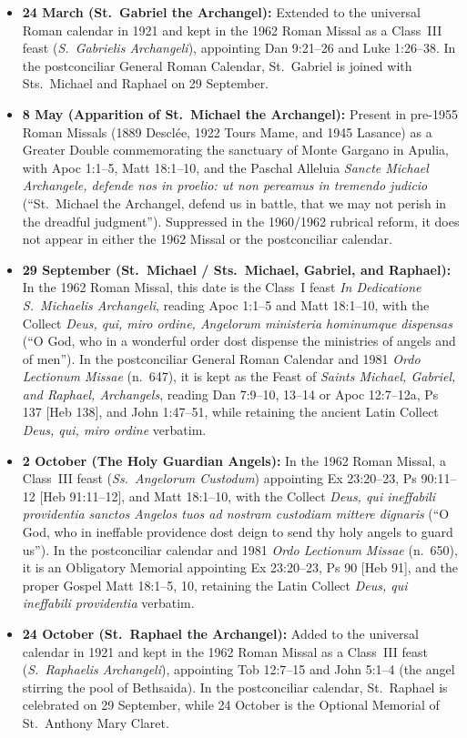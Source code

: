 \begin{itemize}
\item \textbf{24 March (St.~Gabriel the Archangel):} Extended to the universal Roman calendar in 1921 and kept in the 1962 Roman Missal as a Class~III feast (\emph{S.~Gabrielis Archangeli}), appointing Dan 9:21--26 and Luke 1:26--38. In the postconciliar General Roman Calendar, St.~Gabriel is joined with Sts.~Michael and Raphael on 29 September.
\item \textbf{8 May (Apparition of St.~Michael the Archangel):} Present in pre-1955 Roman Missals (1889 Descl\'ee, 1922 Tours Mame, and 1945 Lasance) as a Greater Double commemorating the sanctuary of Monte Gargano in Apulia, with Apoc 1:1--5, Matt 18:1--10, and the Paschal Alleluia \emph{Sancte Michael Archangele, defende nos in proelio: ut non pereamus in tremendo judicio} (``St.~Michael the Archangel, defend us in battle, that we may not perish in the dreadful judgment''). Suppressed in the 1960/1962 rubrical reform, it does not appear in either the 1962 Missal or the postconciliar calendar.
\item \textbf{29 September (St.~Michael / Sts.~Michael, Gabriel, and Raphael):} In the 1962 Roman Missal, this date is the Class~I feast \emph{In Dedicatione S.~Michaelis Archangeli}, reading Apoc 1:1--5 and Matt 18:1--10, with the Collect \emph{Deus, qui, miro ordine, Angelorum ministeria hominumque dispensas} (``O God, who in a wonderful order dost dispense the ministries of angels and of men''). In the postconciliar General Roman Calendar and 1981 \emph{Ordo Lectionum Missae} (n.~647), it is kept as the Feast of \emph{Saints Michael, Gabriel, and Raphael, Archangels}, reading Dan 7:9--10, 13--14 or Apoc 12:7--12a, Ps 137 [Heb 138], and John 1:47--51, while retaining the ancient Latin Collect \emph{Deus, qui, miro ordine} verbatim.
\item \textbf{2 October (The Holy Guardian Angels):} In the 1962 Roman Missal, a Class~III feast (\emph{Ss.~Angelorum Custodum}) appointing Ex 23:20--23, Ps 90:11--12 [Heb 91:11--12], and Matt 18:1--10, with the Collect \emph{Deus, qui ineffabili providentia sanctos Angelos tuos ad nostram custodiam mittere dignaris} (``O God, who in ineffable providence dost deign to send thy holy angels to guard us''). In the postconciliar calendar and 1981 \emph{Ordo Lectionum Missae} (n.~650), it is an Obligatory Memorial appointing Ex 23:20--23, Ps 90 [Heb 91], and the proper Gospel Matt 18:1--5, 10, retaining the Latin Collect \emph{Deus, qui ineffabili providentia} verbatim.
\item \textbf{24 October (St.~Raphael the Archangel):} Added to the universal calendar in 1921 and kept in the 1962 Roman Missal as a Class~III feast (\emph{S.~Raphaelis Archangeli}), appointing Tob 12:7--15 and John 5:1--4 (the angel stirring the pool of Bethsaida). In the postconciliar calendar, St.~Raphael is celebrated on 29 September, while 24 October is the Optional Memorial of St.~Anthony Mary Claret.

\end{itemize}
